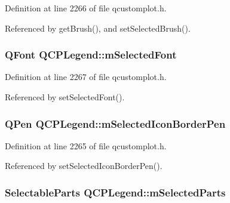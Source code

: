 Definition at line 2266 of file qcustomplot.\+h.



Referenced by get\+Brush(), and set\+Selected\+Brush().

\hypertarget{class_q_c_p_legend_a86ce8f6c20a2f51a48eaf3c24ce16805}{}
\subsubsection[{m\+Selected\+Font}]{\setlength{\rightskip}{0pt plus 5cm}Q\+Font Q\+C\+P\+Legend\+::m\+Selected\+Font\hspace{0.3cm}{\ttfamily [protected]}}\label{class_q_c_p_legend_a86ce8f6c20a2f51a48eaf3c24ce16805}


Definition at line 2267 of file qcustomplot.\+h.



Referenced by set\+Selected\+Font().

\hypertarget{class_q_c_p_legend_a7429ac0e64c7b90b649b4d8f4cc5fa55}{}
\subsubsection[{m\+Selected\+Icon\+Border\+Pen}]{\setlength{\rightskip}{0pt plus 5cm}Q\+Pen Q\+C\+P\+Legend\+::m\+Selected\+Icon\+Border\+Pen\hspace{0.3cm}{\ttfamily [protected]}}\label{class_q_c_p_legend_a7429ac0e64c7b90b649b4d8f4cc5fa55}


Definition at line 2265 of file qcustomplot.\+h.



Referenced by set\+Selected\+Icon\+Border\+Pen().

\hypertarget{class_q_c_p_legend_a917a34dd2856baafd8d56852d94d00e2}{}
\subsubsection[{m\+Selected\+Parts}]{\setlength{\rightskip}{0pt plus 5cm}Selectable\+Parts Q\+C\+P\+Legend\+::m\+Selected\+Parts\hspace{0.3cm}{\ttfamily [protected]}}\label{class_q_c_p_legend_a917a34dd2856baafd8d56852d94d00e2}


